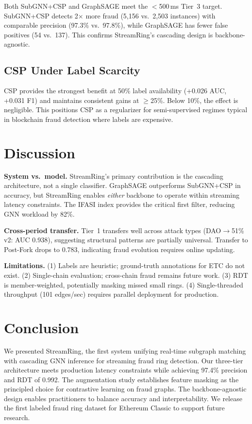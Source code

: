 \documentclass[sigconf, anonymous, review]{acmart}
\begin{document}
Both SubGNN+CSP and GraphSAGE meet the $<$500\,ms Tier~3 target. SubGNN+CSP detects 2$\times$ more fraud (5,156 vs.\ 2,503 instances) with comparable precision (97.3\% vs.\ 97.8\%), while GraphSAGE has fewer false positives (54 vs.\ 137). This confirms StreamRing's cascading design is backbone-agnostic.

\subsection{CSP Under Label Scarcity}

CSP provides the strongest benefit at 50\% label availability (+0.026 AUC, +0.031 F1) and maintains consistent gains at $\geq$25\%. Below 10\%, the effect is negligible. This positions CSP as a regularizer for semi-supervised regimes typical in blockchain fraud detection where labels are expensive.

\section{Discussion}
\label{sec:discussion}

\textbf{System vs.\ model.} StreamRing's primary contribution is the cascading architecture, not a single classifier. GraphSAGE outperforms SubGNN+CSP in accuracy, but StreamRing enables \emph{either} backbone to operate within streaming latency constraints. The IFASI index provides the critical first filter, reducing GNN workload by 82\%.

\textbf{Cross-period transfer.} Tier~1 transfers well across attack types (DAO$\to$51\% v2: AUC 0.938), suggesting structural patterns are partially universal. Transfer to Post-Fork drops to 0.783, indicating fraud evolution requires online updating.

\textbf{Limitations.} (1) Labels are heuristic; ground-truth annotations for ETC do not exist. (2) Single-chain evaluation; cross-chain fraud remains future work. (3) RDT is member-weighted, potentially masking missed small rings. (4) Single-threaded throughput (101 edges/sec) requires parallel deployment for production.

\section{Conclusion}

We presented StreamRing, the first system unifying real-time subgraph matching with cascading GNN inference for streaming fraud ring detection. Our three-tier architecture meets production latency constraints while achieving 97.4\% precision and RDT of 0.992. The augmentation study establishes feature masking as the principled choice for contrastive learning on fraud graphs. The backbone-agnostic design enables practitioners to balance accuracy and interpretability. We release the first labeled fraud ring dataset for Ethereum Classic to support future research.
\end{document}
